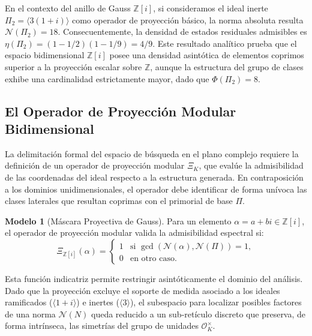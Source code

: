 \documentclass{article}
\numberwithin{equation}{section}
\theoremstyle{plain}
\theoremstyle{definition}
\newtheorem{modelo}[teorema]{Modelo}
\begin{document}
En el contexto del anillo de Gauss $\mathbb{Z}[i]$, si consideramos el ideal inerte $\Pi_2 = \langle 3(1+i) \rangle$ como operador de proyección básico, la norma absoluta resulta $\mathcal{N}(\Pi_2) = 18$. Consecuentemente, la densidad de estados residuales admisibles es $\eta(\Pi_2) = (1 - 1/2)(1 - 1/9) = 4/9$. Este resultado analítico prueba que el espacio bidimensional $\mathbb{Z}[i]$ posee una densidad asintótica de elementos coprimos superior a la proyección escalar sobre $\mathbb{Z}$, aunque la estructura del grupo de clases exhibe una cardinalidad estrictamente mayor, dado que $\Phi(\Pi_2) = 8$.

\subsection{El Operador de Proyección Modular Bidimensional}

La delimitación formal del espacio de búsqueda en el plano complejo requiere la definición de un operador de proyección modular $\Xi_K$, que evalúe la admisibilidad de las coordenadas del ideal respecto a la estructura generada. En contraposición a los dominios unidimensionales, el operador debe identificar de forma unívoca las clases laterales que resultan coprimas con el primorial de base $\Pi$.

\begin{modelo}[Máscara Proyectiva de Gauss]
Para un elemento $\alpha = a + bi \in \mathbb{Z}[i]$, el operador de proyección modular valida la admisibilidad espectral si:
\begin{equation}
    \Xi_{\mathbb{Z}[i]}(\alpha) = 
    \begin{cases} 
    1 & \text{si } \gcd(\mathcal{N}(\alpha), \mathcal{N}(\Pi)) = 1, \\
    0 & \text{en otro caso.}
    \end{cases}
\end{equation}
\end{modelo}

Esta función indicatriz permite restringir asintóticamente el dominio del análisis. Dado que la proyección excluye el soporte de medida asociado a los ideales ramificados ($\langle 1+i \rangle$) e inertes ($\langle 3 \rangle$), el subespacio para localizar posibles factores de una norma $\mathcal{N}(N)$ queda reducido a un sub-retículo discreto que preserva, de forma intrínseca, las simetrías del grupo de unidades $\mathcal{O}_K^\times$.

\end{document}
